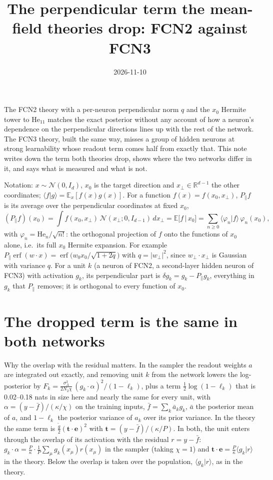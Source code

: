 \documentclass[11pt,a4paper]{article}
\title{The perpendicular term the mean-field theories drop: FCN2 against FCN3}
\author{}
\date{2026-11-10}
\newcommand{\E}{\mathbb E}
\newcommand{\erf}{\operatorname{erf}}
\begin{document}
\maketitle

The FCN2 theory with a per-neuron perpendicular norm $q$ and the $x_0$ Hermite tower to $\mathrm{He}_{11}$ matches the
exact posterior without any account of how a neuron's dependence on the perpendicular directions lines up with the
rest of the network. The FCN3 theory, built the same way, misses a group of hidden neurons at strong learnability whose
readout term comes half from exactly that. This note writes down the term both theories drop, shows where the two
networks differ in it, and says what is measured and what is not.

Notation: $x\sim\mathcal N(0,I_d)$, $x_0$ is the target direction and $x_\perp\in\mathbb R^{d-1}$ the other
coordinates; $\langle f|g\rangle=\E_x[f(x)g(x)]$. For a function $f(x)=f(x_0,x_\perp)$, $P_\parallel f$ is its average over
the perpendicular coordinates at fixed $x_0$,
\begin{equation*}
  (P_\parallel f)(x_0)=\int f(x_0,x_\perp)\,\mathcal N(x_\perp;0,I_{d-1})\,dx_\perp=\E\big[f\,\big|\,x_0\big]
  =\sum_{n\ge0}\langle\varphi_n|f\rangle\,\varphi_n(x_0),
\end{equation*}
with $\varphi_n=\mathrm{He}_n/\sqrt{n!}$: the orthogonal projection of $f$ onto the functions of $x_0$ alone, i.e.\ its
full $x_0$ Hermite expansion. For example $P_\parallel\erf(w\cdot x)=\erf\big(w_0x_0/\sqrt{1+2q}\big)$ with
$q=|w_\perp|^2$, since $w_\perp\cdot x_\perp$ is Gaussian with variance $q$. For a unit $k$ (a neuron of FCN2, a
second-layer hidden neuron of FCN3) with activation $g_k$, its perpendicular part is
$\delta g_k=g_k-P_\parallel g_k$, everything in $g_k$ that $P_\parallel$ removes; it is orthogonal to
every function of $x_0$.

\section*{The dropped term is the same in both networks}

Why the overlap with the residual matters. In the sampler the readout weights $a$ are integrated out exactly, and
removing unit $k$ from the network lowers the log-posterior by
$F_k=\frac{\sigma_A^2}{2N_2\chi}\,(g_k\cdot\alpha)^2/(1-\ell_k)$, plus a term $\frac12\log(1-\ell_k)$ that is
0.02--0.18 nats in size here and nearly the same for every unit, with $\alpha=(y-\bar f)/(\kappa/\chi)$ on the training
inputs, $\bar f=\sum_k\bar a_kg_k$, $\bar a$ the posterior mean of $a$, and $1-\ell_k$ the posterior variance of $a_k$ over
its prior variance. In the theory the same term is $\frac{\tilde g}{2}(\mathbf t\cdot\mathbf e)^2$ with
$\mathbf t=(y-\bar f)/(\kappa/P)$. In both, the unit enters through the overlap of its activation with the residual
$r=y-\bar f$: $g_k\cdot\alpha=\frac P\kappa\cdot\frac1P\sum_\mu g_k(x_\mu)r(x_\mu)$ in the sampler (taking $\chi=1$) and
$\mathbf t\cdot\mathbf e=\frac P\kappa\langle g_k|r\rangle$ in the theory. Below the overlap is taken over the population,
$\langle g_k|r\rangle$, as in the theory.
\end{document}
